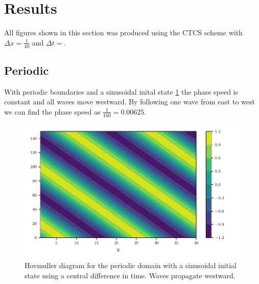 \newpage
\section{Results}


All figures shown in this section was produced using the CTCS scheme with
$\Delta x = \frac{1}{40} $ and $\Delta t = $.

\subsection{Periodic}

With periodic boundaries and a sinusoidal inital state \cref{fig:periodic_sine}
the phase speed is constant and all waves move westward. By following one wave
from east to west we can find the phase speed as $\frac{1}{160} = 0.00625$.

\begin{figure}[htp]
  \centering
  \includegraphics[width=\textwidth]{../figures/psi_periodic_centered_short.pdf}
  \caption{Hovmuller diagram for the periodic domain with a sinusoidal initial
  state using a central difference in time. Waves propagate westward.}
  \label{fig:periodic_sine}
\end{figure}



